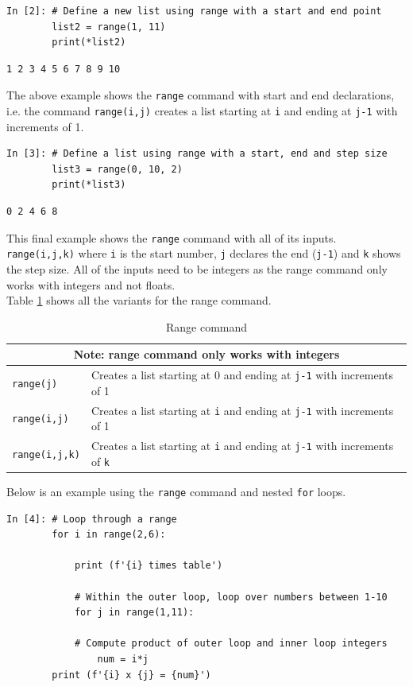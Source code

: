 \begin{lstlisting}[style=PY]
In [2]: # Define a new list using range with a start and end point
        list2 = range(1, 11)
        print(*list2)
\end{lstlisting}
\begin{lstlisting}[style=PY_out]
        1 2 3 4 5 6 7 8 9 10
\end{lstlisting}
The above example shows the {\tt range} command with start and end declarations, i.e. the command \texttt{range(i,j)} creates a list starting at \texttt{i} and ending at \texttt{j-1} with increments of 1.
\begin{lstlisting}[style=PY]
In [3]: # Define a list using range with a start, end and step size
        list3 = range(0, 10, 2)
        print(*list3)
\end{lstlisting}
\begin{lstlisting}[style=PY_out]
        0 2 4 6 8
\end{lstlisting}
This final example shows the {\tt range} command with all of its inputs. \texttt{range(i,j,k)} where \texttt{i} is the start number, \texttt{j} declares the end (\texttt{j-1}) and \texttt{k} shows the step size. All of the inputs need to be integers as the range command only works with integers and not floats.\\
Table \ref{tab:rc} shows all the variants for the range command.
\begin{table}[H]
\begin{center}
\begin{tabular}{|l | p{7cm}|}
\hline
\multicolumn{2}{|c|}{\color{blue}Note: range command only works with integers}\\\hline
\texttt{range(j)} & Creates a list starting at 0 and ending at \texttt{j-1} with increments of 1\\\hline
\texttt{range(i,j)} & Creates a list starting at \texttt{i} and ending at \texttt{j-1} with increments of 1\\\hline
\texttt{range(i,j,k)} & Creates a list starting at \texttt{i} and ending at \texttt{j-1} with increments of \texttt{k}\\\hline
\end{tabular}
\end{center}
\caption {Range command}
\label{tab:rc}
\end{table}
\noindent Below is an example using the {\tt range} command and nested {\tt for} loops.
\begin{lstlisting}[style=PY]
In [4]: # Loop through a range 
        for i in range(2,6):
        
            print (f'{i} times table')
	        
            # Within the outer loop, loop over numbers between 1-10 
            for j in range(1,11):
	        
	        # Compute product of outer loop and inner loop integers
                num = i*j
		print (f'{i} x {j} = {num}')
\end{lstlisting}

